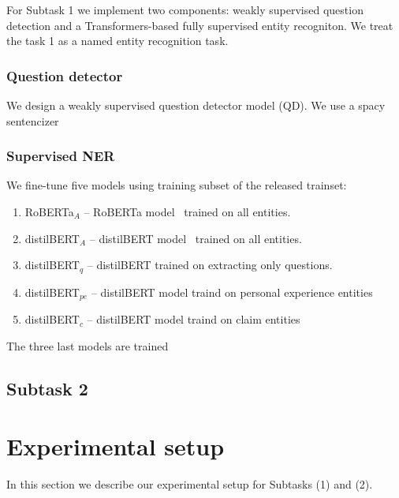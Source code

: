 \documentclass[11pt]{article}
\begin{document}
For Subtask 1 we implement two components: weakly supervised question detection and a Transformers-based fully supervised entity recogniton.
We treat the task 1 as a named entity recognition task.

\subsubsection*{Question detector}


We design a weakly supervised question detector model (QD).
We use a spacy sentencizer



\subsubsection*{Supervised NER}


We fine-tune five models using training subset of the released trainset:

\begin{enumerate}
\item RoBERTa$_A$ -- RoBERTa model~\cite{Liu2019RoBERTaAR} trained on all entities. %
\item distilBERT$_A$ -- distilBERT model~\cite{Sanh2019DistilBERTAD} trained on all entities.  %
\item  distilBERT$_q$ --  distilBERT trained on extracting only questions. %
\item distilBERT$_{pe}$ -- distilBERT model traind on personal experience entities %
\item distilBERT$_c$ -- distilBERT model traind on claim entities %
\end{enumerate}

The three last models are trained 




\subsection{Subtask 2}


\section{Experimental setup}
In this section we describe our experimental setup for Subtasks (1) and (2). 
\end{document}
